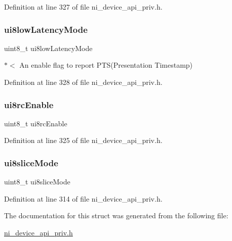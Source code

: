 Definition at line 327 of file ni\+\_\+device\+\_\+api\+\_\+priv.\+h.

\mbox{\label{struct__ni__encoder__config__t_a3bd0707275f514091b2052764363c829}} 
\subsubsection{\texorpdfstring{ui8lowLatencyMode}{ui8lowLatencyMode}}
{\footnotesize\ttfamily uint8\+\_\+t ui8low\+Latency\+Mode}

$\ast$$<$ An enable flag to report P\+T\+S(\+Presentation Timestamp) 

Definition at line 328 of file ni\+\_\+device\+\_\+api\+\_\+priv.\+h.

\mbox{\label{struct__ni__encoder__config__t_a5a4294be589632753c79c548ccd49e68}} 
\subsubsection{\texorpdfstring{ui8rcEnable}{ui8rcEnable}}
{\footnotesize\ttfamily uint8\+\_\+t ui8rc\+Enable}



Definition at line 325 of file ni\+\_\+device\+\_\+api\+\_\+priv.\+h.

\mbox{\label{struct__ni__encoder__config__t_a9db7241e83cbbfda6ac58cd37672190b}} 
\subsubsection{\texorpdfstring{ui8sliceMode}{ui8sliceMode}}
{\footnotesize\ttfamily uint8\+\_\+t ui8slice\+Mode}



Definition at line 314 of file ni\+\_\+device\+\_\+api\+\_\+priv.\+h.



The documentation for this struct was generated from the following file\+:\begin{DoxyCompactItemize}
\item 
\mbox{\hyperlink{ni__device__api__priv_8h}{ni\+\_\+device\+\_\+api\+\_\+priv.\+h}}\end{DoxyCompactItemize}
